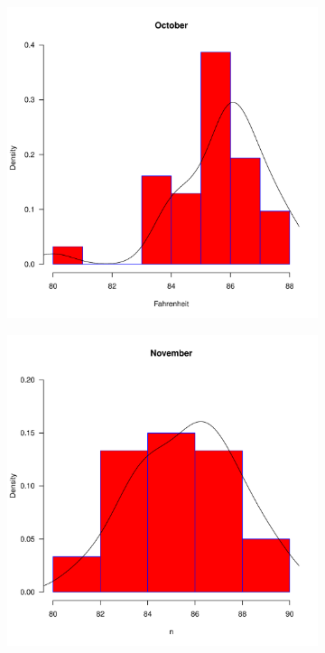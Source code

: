 \documentclass[12pt]{amsart} \usepackage{amscd} \usepackage{epsfig}
\begin{document}
\begin{figure}
\begin{subfigure}{.33\textwidth}
\includegraphics[scale=0.35]{density_october.pdf}
\end{subfigure}

\begin{subfigure}{.33\textwidth}
\includegraphics[scale=0.35]{density_november.pdf}
\end{subfigure}


\end{figure}
\end{document}
